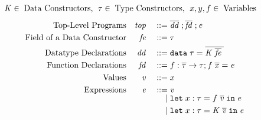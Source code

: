 

\begin{displaymath}
  \begin{aligned}
  &\DC \in \; \textup{Data Constructors},\:\: \TYP \in \; \textup{Type Constructors},
  \:\: \var, \yvar,\fvar \in \; \textup{Variables}%
  \end{aligned}
\end{displaymath}
\begin{displaymath}
  \begin{aligned}
    \textup{Top-Level Programs} && \PROG && \gramdef & \vectorize{\DD} \;; \vectorize{\FD} \;; \EXPR \\
    \textup{Field of a Data Constructor} && \fields && \gramdef & \sTYP  \\
    \textup{Datatype Declarations} && \DD && \gramdef & \DATA\;\TYP = \vectorize{\DC \; \vectorize{\fields}\;} \\
    \textup{Function Declarations} && \FD && \gramdef & \fvar : \vectorize{\TYP} \ARROW \TYP ; \fappnoloc{\vectorize{\var}} = \EXPR \\
    \textup{Values} && \VAL && \gramdef & \var \\ %
    \textup{Expressions} && \EXPR && \gramdef & \VAL\\[-5pt]
    && && \gramor & \letpack{\var:\TYP}{\fappnoloc{\vectorize{\VAL}}}{\EXPR} \\
    && && \gramor & \letpack{\var:\TYP}{\dataconnoloc{\DC}{\vectorize{\VAL}}}{\EXPR} \\

\end{aligned}
\end{displaymath}
